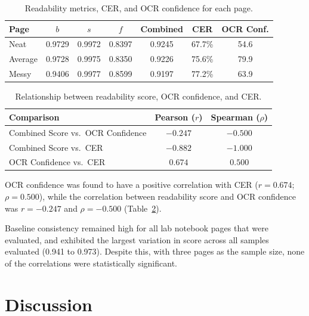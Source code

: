 \documentclass[conference]{IEEEtran}
\begin{document}
\begin{table}[t]
  \centering
  \caption{Readability metrics, CER, and OCR confidence for each page.}
  \label{tab:raw}
  \footnotesize
  \setlength{\tabcolsep}{4pt}
  \begin{tabular}{@{}lcccccc@{}}
    \toprule
    Page & $b$ & $s$ & $f$ & Combined & CER & OCR Conf. \\
    \midrule
    Neat    & 0.9729 & 0.9972 & 0.8397 & 0.9245 & 67.7\% & 54.6 \\
    Average & 0.9728 & 0.9975 & 0.8350 & 0.9226 & 75.6\% & 79.9 \\
    Messy   & 0.9406 & 0.9977 & 0.8599 & 0.9197 & 77.2\% & 63.9 \\
    \bottomrule
  \end{tabular}
\end{table}

\begin{table}[t]
  \centering
  \caption{Relationship between readability score, OCR confidence, and CER.}
  \label{tab:corr}
  \footnotesize
  \begin{tabular}{@{}lcc@{}}
    \toprule
    Comparison & Pearson ($r$) & Spearman ($\rho$) \\
    \midrule
    Combined Score vs.\ OCR Confidence & $-0.247$ & $-0.500$ \\
    Combined Score vs.\ CER            & $-0.882$ & $-1.000$ \\
    OCR Confidence vs.\ CER            & $0.674$  & $0.500$  \\
    \bottomrule
  \end{tabular}
\end{table}

OCR confidence was found to have a positive correlation with CER
($r = 0.674$; $\rho = 0.500$), while the correlation between readability score
and OCR confidence was $r = -0.247$ and $\rho = -0.500$
(Table~\ref{tab:corr}).

Baseline consistency remained high for all lab notebook pages that were
evaluated, and exhibited the largest variation in score across all samples
evaluated (0.941 to 0.973). Despite this, with three pages as the sample size,
none of the correlations were statistically significant.

\section{Discussion}
\end{document}
